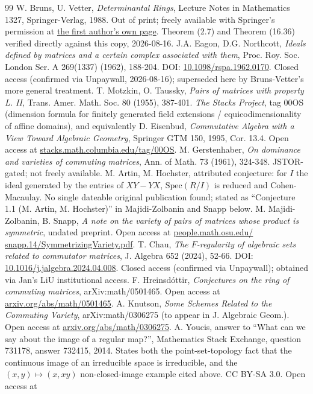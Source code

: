 \documentclass[a4paper,11pt]{scrartcl}
\begin{document}
\begin{thebibliography}{99}
 W. Bruns, U. Vetter, \emph{Determinantal Rings}, Lecture Notes in Mathematics 1327, Springer-Verlag, 1988. Out of print; freely available with Springer's permission at \href{https://www.home.uni-osnabrueck.de/wbruns/brunsw/detrings.pdf}{the first author's own page}. Theorem (2.7) and Theorem (16.36) verified directly against this copy, 2026-08-16.   J.A. Eagon, D.G. Northcott, \emph{Ideals defined by matrices and a certain complex associated with them}, Proc. Roy. Soc. London Ser. A 269(1337) (1962), 188-204. DOI: \href{https://doi.org/10.1098/rspa.1962.0170}{10.1098/rspa.1962.0170}. Closed access (confirmed via Unpaywall, 2026-08-16); superseded here by Bruns-Vetter's more general treatment.   T. Motzkin, O. Taussky, \emph{Pairs of matrices with property L. II}, Trans. Amer. Math. Soc. 80 (1955), 387-401.   \emph{The Stacks Project}, tag 00OS (dimension formula for finitely generated field extensions / equicodimensionality of affine domains), and equivalently D. Eisenbud, \emph{Commutative Algebra with a View Toward Algebraic Geometry}, Springer GTM 150, 1995, Cor. 13.4. Open access at \href{https://stacks.math.columbia.edu/tag/00OS}{stacks.math.columbia.edu/tag/00OS}.   M. Gerstenhaber, \emph{On dominance and varieties of commuting matrices}, Ann. of Math. 73 (1961), 324-348. JSTOR-gated; not freely available.   M. Artin, M. Hochster, attributed conjecture: for \(I\) the ideal generated by the entries of \(XY - YX\), \(\text{Spec}(R/I)\) is reduced and Cohen-Macaulay. No single dateable original publication found; stated as ``Conjecture 1.1 (M. Artin, M. Hochster)'' in Majidi-Zolbanin and Snapp below.   M. Majidi-Zolbanin, B. Snapp, \emph{A note on the variety of pairs of matrices whose product is symmetric}, undated preprint. Open access at \href{https://people.math.osu.edu/snapp.14/SymmetrizingVariety.pdf}{people.math.osu.edu/ snapp.14/SymmetrizingVariety.pdf}.   T. Chau, \emph{The \(F\)-regularity of algebraic sets related to commutator matrices}, J. Algebra 652 (2024), 52-66. DOI: \href{https://doi.org/10.1016/j.jalgebra.2024.04.008}{10.1016/j.jalgebra.2024.04.008}. Closed access (confirmed via Unpaywall); obtained via Jan's LiU institutional access.   F. Hreinsdóttir, \emph{Conjectures on the ring of commuting matrices}, arXiv:math/0501465. Open access at \href{https://arxiv.org/abs/math/0501465}{arxiv.org/abs/math/0501465}.   A. Knutson, \emph{Some Schemes Related to the Commuting Variety}, arXiv:math/0306275 (to appear in J. Algebraic Geom.). Open access at \href{https://arxiv.org/abs/math/0306275}{arxiv.org/abs/math/0306275}.   A. Youcis, answer to ``What can we say about the image of a regular map?'', Mathematics Stack Exchange, question 731178, answer 732415, 2014. States both the point-set-topology fact that the continuous image of an irreducible space is irreducible, and the \((x,y) \mapsto (x,xy)\) non-closed-image example cited above. CC BY-SA 3.0. Open access at 
\end{thebibliography}
\end{document}
